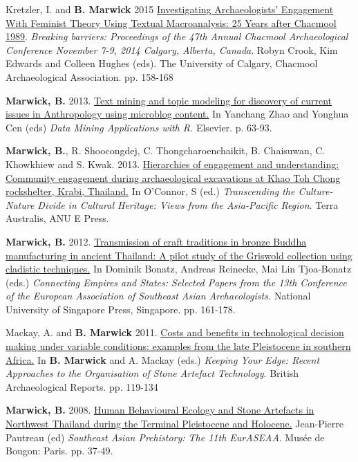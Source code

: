 \documentclass[11pt,article,oneside]{memoir}
\begin{document}
{{{{\ind Kretzler, I. and \textbf{B. Marwick} 2015 \href{http://faculty.washington.edu/bmarwick/PDFs/Kretzler_Marwick_2014_Chacmool.pdf}{Investigating Archaeologists' Engagement With Feminist Theory Using Textual Macroanalysis: 25 Years after Chacmool 1989}. \textit{Breaking barriers: Proceedings of the 47th Annual Chacmool Archaeological Conference November 7-9, 2014 Calgary, Alberta, Canada}. Robyn Crook, Kim Edwards and Colleen Hughes (eds). The University of Calgary, Chacmool Archaeological Association. pp. 158-168

\ind \textbf{Marwick, B.} 2013. \href{http://faculty.washington.edu/bmarwick/PDFs/Marwick_2013_DMAR.pdf}{Text mining and topic modeling for discovery of current issues in Anthropology using microblog content.} In  Yanchang Zhao and Yonghua Cen (eds) \textit{Data Mining Applications with R.} Elsevier. p. 63-93.

\ind \textbf{Marwick, B.}, R. Shoocongdej, C. Thongcharoenchaikit, B. Chaisuwan, C. Khowkhiew and S. Kwak.  2013. \href{http://faculty.washington.edu/bmarwick/PDFs/Marwick_et_al_2013_community.pdf}{Hierarchies of engagement and understanding: Community engagement during archaeological excavations at Khao Toh Chong rockshelter, Krabi, Thailand.} In O’Connor, S (ed.) \textit{Transcending the Culture-Nature Divide in Cultural Heritage: Views from the Asia-Pacific Region}. Terra Australis, ANU E Press.

\ind \textbf{Marwick, B.} 2012. \href{http://faculty.washington.edu/bmarwick/PDFs/Marwick_2012_Buddha_cladistics.pdf}{Transmission of craft traditions in bronze Buddha manufacturing in ancient Thailand: A pilot study of the Griswold collection using cladistic techniques.} In Dominik Bonatz, Andreas Reinecke, Mai Lin Tjoa-Bonatz (eds.)\textit{ Connecting Empires and States: Selected Papers from the 13th Conference of the European Association of Southeast Asian Archaeologists.} National University of Singapore Press, Singapore. pp. 161-178.

\ind Mackay, A. and \textbf{B. Marwick} 2011. \href{http://faculty.washington.edu/bmarwick/PDFs/Mackay_and_Marwick_2011_timecost.pdf}{Costs and benefits in technological decision making under variable conditions: examples from the late Pleistocene in southern Africa.} In \textbf{B. Marwick} and A. Mackay (eds.) \textit{Keeping Your Edge: Recent Approaches to the Organisation of Stone Artefact Technology}. British Archaeological Reports.  pp. 119-134

\ind \textbf{Marwick, B.} 2008. \href{http://faculty.washington.edu/bmarwick/PDFs/Marwick_2008_EurASEAA.pdf}{Human Behavioural Ecology and Stone Artefacts in Northwest Thailand during the Terminal Pleistocene and Holocene.} Jean-Pierre Pautreau (ed) \textit{Southeast Asian Prehistory: The 11th EurASEAA}. Musée de Bougon: Paris. pp. 37-49.

}}}}
\end{document}

